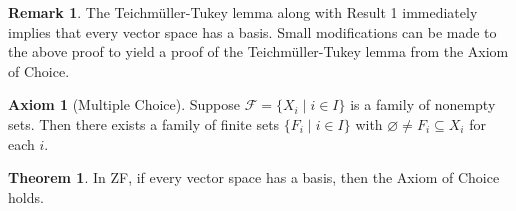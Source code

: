 \documentclass[12pt]{article}
\let\emptyset\varnothing
\theoremstyle{definition}
\newtheorem*{theorem}{\color{blue} Theorem}
\newtheorem*{remark}{\color{RedOrange} Remark}
\newtheorem*{axiom}{\color{purple} Axiom}
\begin{document}
\begin{remark}
	The Teichmüller-Tukey lemma along with Result 1 immediately implies that every vector space has a basis. Small modifications can be made to the above proof to yield a proof of the Teichmüller-Tukey lemma from the Axiom of Choice.
\end{remark}

\begin{axiom}[Multiple Choice]
	Suppose $\mathcal{F} = \{X_i\mid i\in I\}$ is a family of nonempty sets. Then there exists a family of finite sets $\{F_i\mid i\in I\}$ with $\emptyset\neq F_i\subseteq X_i$ for each $i$.
\end{axiom}

\begin{theorem}
	In ZF, if every vector space has a basis, then the Axiom of Choice holds.
\end{theorem}
\end{document}

